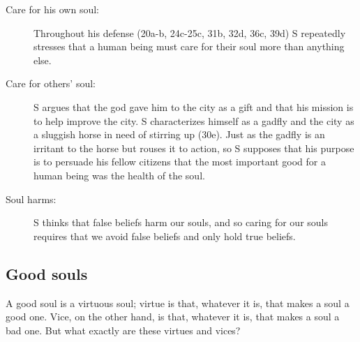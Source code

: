 \documentclass[oneside]{article}
\begin{document}
\begin{description}
\item[Care for his own soul:] Throughout his defense (20a-b, 24c-25c, 31b, 32d, 36c, 39d) S repeatedly stresses that a human being must care for their soul more than anything else. 
\item[Care for others' soul:] S argues that the god gave him to the city as a gift and that his mission is to help improve the city.  S characterizes himself as a gadfly and the city as a sluggish horse in need of stirring up (30e).  Just as the gadfly is an irritant to the horse but rouses it to action, so S supposes that his purpose is to persuade his fellow citizens that the most important good for a human being was the health of the soul.
\item[Soul harms:] S thinks that false beliefs harm our souls, and so caring for our souls requires that we avoid false beliefs and only hold true beliefs. 
\end{description}

\subsection*{Good souls}
A good soul is a virtuous soul; virtue is that, whatever it is, that makes a soul a good one. Vice, on the other hand, is that, whatever it is, that makes a soul a bad one. But what exactly are these virtues and vices? 
\end{document}

